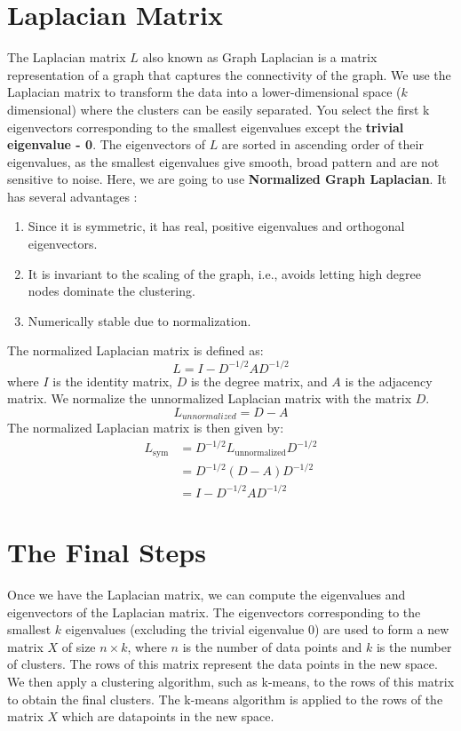\documentclass{article}
\begin{document}
\section{Laplacian Matrix}
\label{sec:laplacian}
The Laplacian matrix $L$ also known as Graph Laplacian is a matrix representation of a graph that captures the connectivity of the graph. We use the Laplacian matrix to transform the data into a lower-dimensional space ($k$ dimensional) where the clusters can be easily separated. You select the first k eigenvectors corresponding to the smallest eigenvalues except the \textbf{trivial eigenvalue - 0}. The eigenvectors of $L$ are sorted in ascending order of their eigenvalues, as the smallest eigenvalues give smooth, broad pattern and are not sensitive to noise. Here, we are going to use \textbf{Normalized Graph Laplacian}. It has several advantages :
\begin{enumerate}
\item Since it is symmetric, it has real, positive eigenvalues and orthogonal eigenvectors.
\item It is invariant to the scaling of the graph, i.e., avoids letting high degree nodes dominate the clustering.
\item Numerically stable due to normalization.
\end{enumerate}
The normalized Laplacian matrix is defined as:
\begin{equation}
L = I - D^{-1/2} A D^{-1/2}
\end{equation}
where $I$ is the identity matrix, $D$ is the degree matrix, and $A$ is the adjacency matrix. We normalize the unnormalized Laplacian matrix with the matrix $D$.
\begin{equation}
L_{unnormalized} = D - A
\end{equation}
The normalized Laplacian matrix is then given by:
\begin{align*}
L_{\text{sym}} 
&= D^{-1/2} L_{\text{unnormalized}} D^{-1/2} \\
&= D^{-1/2} (D - A) D^{-1/2} \\
&= I - D^{-1/2} A D^{-1/2}
\end{align*}

\section{The Final Steps}
\label{sec:final}
Once we have the Laplacian matrix, we can compute the eigenvalues and eigenvectors of the Laplacian matrix. The eigenvectors corresponding to the smallest $k$ eigenvalues (excluding the trivial eigenvalue 0) are used to form a new matrix $X$ of size $n \times k$, where $n$ is the number of data points and $k$ is the number of clusters. The rows of this matrix represent the data points in the new space. We then apply a clustering algorithm, such as k-means, to the rows of this matrix to obtain the final clusters. The k-means algorithm is applied to the rows of the matrix $X$ which are datapoints in the new space.
\end{document}
